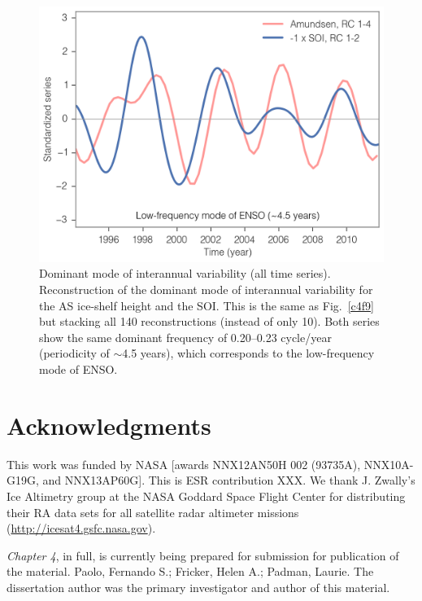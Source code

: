 \begin{figure}[!ht]
  \centering
  \includegraphics[width=.75\textwidth]{img/amu_soi_modes_all.png}
  \caption[Dominant mode of interannual variability (all time series)]{
  \ssp \footnotesize
  Dominant mode of interannual variability (all time series). Reconstruction of the dominant mode of interannual variability for the AS ice-shelf height and the SOI. This is the same as Fig.~\ref{c4f9} but stacking all 140 reconstructions (instead of only 10). Both series show the same dominant frequency of 0.20--0.23 cycle/year (periodicity of $\sim$4.5 years), which corresponds to the low-frequency mode of ENSO.
  }
  \label{c4f12}
\end{figure}


\clearpage
\section*{Acknowledgments}

This work was funded by NASA [awards NNX12AN50H 002
(93735A), NNX10A-G19G, and NNX13AP60G]. This is ESR
contribution XXX. We thank J. Zwally's Ice Altimetry group
at the NASA Goddard Space Flight Center for distributing their
RA data sets for all satellite radar altimeter missions
(\url{http://icesat4.gsfc.nasa.gov}).


{\sl Chapter 4}, in full, is currently being prepared for submission for publication
of the material. Paolo, Fernando S.; Fricker, Helen A.; Padman, Laurie. The
dissertation author was the primary investigator and author of this material.
